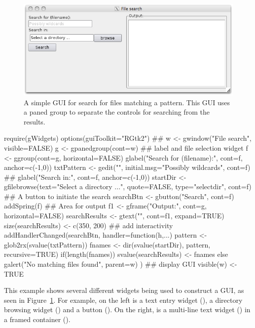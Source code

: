 \begin{figure}
  \centering
  \includegraphics[width=.8\textwidth]{fig-file-search.png}
  \caption{A simple GUI for search for files matching a pattern. This
    GUI uses a paned group to separate the controls for searching from
    the results.}
  \label{fig:file-search}
\end{figure}

\begin{Schunk}
\begin{Sinput}
 require(gWidgets)
 options(guiToolkit="RGtk2")
 ## 
 w <- gwindow("File search", visible=FALSE)
 g <- gpanedgroup(cont=w)
 ## label and file selection widget
 f <- ggroup(cont=g, horizontal=FALSE)
 glabel("Search for (filename):", cont=f, anchor=c(-1,0))
 txtPattern <- gedit("", initial.msg="Possibly wildcards", cont=f)
 ##
 glabel("Search in:", cont=f, anchor=c(-1,0))
 startDir <- gfilebrowse(text="Select a directory ...",
                         quote=FALSE,
                         type="selectdir", cont=f)
 ## A button to initiate the search
 searchBtn <- gbutton("Search", cont=f)
 addSpring(f)
 ## Area for output
 f1 <- gframe("Output:", cont=g, horizontal=FALSE)
 searchResults <- gtext("", cont=f1, expand=TRUE)
 size(searchResults) <- c(350, 200)
 ## add interactivity
 addHandlerChanged(searchBtn, handler=function(h,...) {
   pattern <- glob2rx(svalue(txtPattern))
   fnames <- dir(svalue(startDir), pattern, recursive=TRUE)
   if(length(fnames))
     svalue(searchResults) <- fnames
   else
     galert("No matching files found", parent=w)
 })
 ## display GUI
 visible(w) <- TRUE
\end{Sinput}
\end{Schunk}

This example shows several different widgets being used to construct a
GUI, as seen in Figure~\ref{fig:file-search}. For example, on the
left is a text entry widget (), a directory browsing
widget () and a button (). On the
right, is a multi-line text widget () in a framed
container ().

